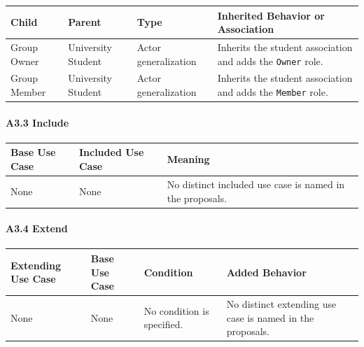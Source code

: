 \documentclass[12pt]{article}
\renewcommand{\baselinestretch}{1.5}
\begin{document}
\begingroup
\small
\renewcommand{\baselinestretch}{1.0}\selectfont
\renewcommand{\arraystretch}{1.15}
\setlength{\tabcolsep}{6pt}
\begin{longtable}{|>{\raggedright\arraybackslash}p{}|>{\raggedright\arraybackslash}p{}|>{\raggedright\arraybackslash}p{}|>{\raggedright\arraybackslash}p{}|}
\hline
\textbf{Child} & \textbf{Parent} & \textbf{Type} & \textbf{Inherited Behavior or Association} \\ \hline
\endhead
Group Owner & University Student & Actor generalization & Inherits the student association and adds the \texttt{Owner} role. \\ \hline
Group Member & University Student & Actor generalization & Inherits the student association and adds the \texttt{Member} role. \\ \hline
\end{longtable}
\endgroup
\par\medskip

\hypertarget{sec:a3-3-include}{}
\paragraph*{A3.3 Include}
\par\medskip

\begingroup
\small
\renewcommand{\baselinestretch}{1.0}\selectfont
\renewcommand{\arraystretch}{1.15}
\setlength{\tabcolsep}{6pt}
\begin{longtable}{|>{\raggedright\arraybackslash}p{}|>{\raggedright\arraybackslash}p{}|>{\raggedright\arraybackslash}p{}|}
\hline
\textbf{Base Use Case} & \textbf{Included Use Case} & \textbf{Meaning} \\ \hline
\endhead
None & None & No distinct included use case is named in the proposals. \\ \hline
\end{longtable}
\endgroup
\par\medskip

\hypertarget{sec:a3-4-extend}{}
\paragraph*{A3.4 Extend}
\par\medskip

\begingroup
\small
\renewcommand{\baselinestretch}{1.0}\selectfont
\renewcommand{\arraystretch}{1.15}
\setlength{\tabcolsep}{6pt}
\begin{longtable}{|>{\raggedright\arraybackslash}p{}|>{\raggedright\arraybackslash}p{}|>{\raggedright\arraybackslash}p{}|>{\raggedright\arraybackslash}p{}|}
\hline
\textbf{Extending Use Case} & \textbf{Base Use Case} & \textbf{Condition} & \textbf{Added Behavior} \\ \hline
\endhead
None & None & No condition is specified. & No distinct extending use case is named in the proposals. \\ \hline
\end{longtable}
\endgroup
\par\medskip
\end{document}
